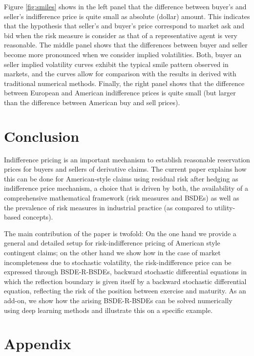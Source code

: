 \documentclass{article}
\begin{document}
Figure \ref{fig:smiles} shows in the left panel that the difference between buyer's and seller's indifference price is quite small as absolute (dollar) amount. This indicates that the hypothesis that seller's and buyer's price correspond to market ask and bid when the risk measure is consider as that of a representative agent is very reasonable. The middle panel shows that the differences between buyer and seller become more pronounced when we consider implied volatilities. Both, buyer an seller implied volatility curves exhibit the typical smile pattern observed in markets, and the curves allow for comparison with the results in \cite[Figure 3.4]{SS15} derived with traditional numerical methods. Finally, the right panel shows that the difference between European and American indifference prices is quite small (but larger than the difference between American buy and sell prices).


\section{Conclusion}\label{sec:conc}

Indifference pricing is an important mechanism to establish reasonable reservation prices for buyers and sellers of derivative claims. The current paper explains how this can be done for American-style claims using residual risk after hedging as indifference price mechanism, a choice that is driven by both, the availability of a comprehensive mathematical framework (risk measures and BSDEs) as well as the prevalence of risk measures in industrial practice (as compared to utility-based concepts).

The main contribution of the paper is twofold: On the one hand we provide a general and detailed setup for risk-indifference pricing of American style contingent claims; on the other hand we show how in the case of market incompleteness due to stochastic volatility, the risk-indifference price can be expressed through BSDE-R-BSDEs, backward stochastic differential equations in which the reflection boundary is given itself by a backward stochastic differential equation, reflecting the risk of the position between exercise and maturity. As an add-on, we show how the arising BSDE-R-BSDEs can be solved numerically using deep learning methods and illustrate this on a specific example.






\appendix
\section{Appendix}
\end{document}
